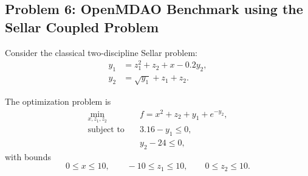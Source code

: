 \subsection*{Problem 6: OpenMDAO Benchmark using the Sellar Coupled Problem}

Consider the classical two-discipline Sellar problem:
\begin{align}
y_1
&=
z_1^2+z_2+x-0.2y_2,
\\
y_2
&=
\sqrt{y_1}+z_1+z_2.
\end{align}

The optimization problem is
\begin{align}
\min_{x,z_1,z_2}\quad
&
f
=
x^2+z_2+y_1+e^{-y_2},
\\
\text{subject to}\quad
&
3.16-y_1\leq0,
\\
&
y_2-24\leq0,
\end{align}
with bounds
\begin{equation}
0\leq x\leq10,
\qquad
-10\leq z_1\leq10,
\qquad
0\leq z_2\leq10.
\end{equation}


